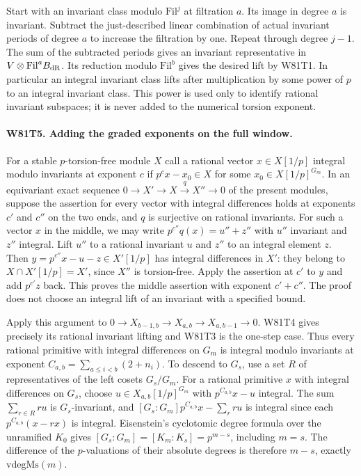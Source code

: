 Start with an invariant class modulo $\mathrm{Fil}^j$ at filtration
$a$. Its image in degree $a$ is invariant. Subtract the just-described
linear combination of actual invariant periods of degree $a$ to
increase the filtration by one. Repeat through degree $j-1$.
The sum of the subtracted periods gives an invariant representative
in $V\otimes\mathrm{Fil}^a B_{\rm dR}$. Its reduction modulo
$\mathrm{Fil}^b$ gives the desired lift by W81T1.
In particular an integral invariant class lifts after multiplication
by some power of $p$ to an integral invariant class. This power is
used only to identify rational invariant subspaces; it is never
added to the numerical torsion exponent.

\paragraph{W81T5. Adding the graded exponents on the full window.}
For a stable $p$-torsion-free module $X$ call a rational vector
$x\in X[1/p]$ integral modulo invariants at exponent $c$ if
$p^cx-x_0\in X$ for some $x_0\in X[1/p]^{G_m}$.
In an equivariant exact sequence
$0\to X'\to X\xrightarrow{q}X''\to0$ of the present modules,
suppose the assertion for every vector with integral differences
holds at exponents $c'$ and $c''$ on the two ends, and $q$ is
surjective on rational invariants. For such a vector $x$ in the
middle, we may write $p^{c''}q(x)=u''+z''$ with $u''$ invariant
and $z''$ integral. Lift $u''$ to a rational invariant $u$ and
$z''$ to an integral element $z$. Then
$y=p^{c''}x-u-z\in X'[1/p]$ has integral differences in $X'$:
they belong to $X\cap X'[1/p]=X'$, since $X''$ is torsion-free.
Apply the assertion at $c'$ to $y$ and add $p^{c'}z$ back. This
proves the middle assertion with exponent $c'+c''$.
The proof does not choose an integral lift of an invariant with a
specified bound.

Apply this argument to
$0\to X_{b-1,b}\to X_{a,b}\to X_{a,b-1}\to0$.
W81T4 gives precisely its rational invariant lifting and W81T3
is the one-step case. Thus every rational primitive with integral
differences on $G_m$ is integral modulo invariants at exponent
$C_{a,b}=\sum_{a\le i<b}(2+n_i)$.
To descend to $G_s$, use a set $R$ of representatives of the
left cosets $G_s/G_m$. For a rational primitive $x$ with integral
differences on $G_s$, choose $u\in X_{a,b}[1/p]^{G_m}$ with
$p^{C_{a,b}}x-u$ integral. The sum $\sum_{r\in R}r u$ is
$G_s$-invariant, and
$[G_s:G_m]p^{C_{a,b}}x-\sum_r r u$ is integral since each
$p^{C_{a,b}}(x-rx)$ is integral. Eisenstein's cyclotomic degree
formula over the unramified $K_0$ gives
$[G_s:G_m]=[K_m:K_s]=p^{m-s}$, including $m=s$.
The difference of the $p$-valuations of their absolute degrees
is therefore $m-s$, exactly $\mathrm{vdegMs}(m)$.


